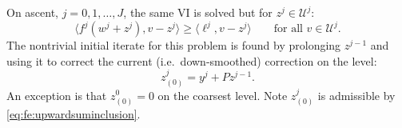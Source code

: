 \documentclass[letterpaper,final,12pt,reqno]{amsart}
\theoremstyle{cstyle}
\theoremstyle{cstyle*}
\theoremstyle{dstyle}
\numberwithin{equation}{section}
\numberwithin{figure}{section}
\numberwithin{table}{section}
\numberwithin{theorem}{section}
\newcommand{\cK}{\mathcal{K}}
\newcommand{\cV}{\mathcal{V}}
\newcommand{\ip}[2]{\langle#1,#2\rangle}
\newcommand{\iR}{R^{\bullet}}
\begin{document}
On ascent, $j=0,1,\dots,J$, the same VI is solved but for $z^j \in \mathcal{U}^j$:
\begin{equation}
\ip{f^j(w^j + z^j)}{v-z^j} \ge \ip{\ell^j}{v-z^j} \qquad \text{for all } v\in \mathcal{U}^j. \label{eq:fe:upvi}
\end{equation}
The nontrivial initial iterate for this problem is found by prolonging $z^{j-1}$ and using it to correct the current (i.e.~down-smoothed) correction on the level:
\begin{equation}
z_{(0)}^j = y^j + P z^{j-1}.  \label{eq:fe:upwardinitial}
\end{equation}
An exception is that $z_{(0)}^0=0$ on the coarsest level.  Note $z_{(0)}^j$ is admissible by \eqref{eq:fe:upwardsuminclusion}.

\end{document}
